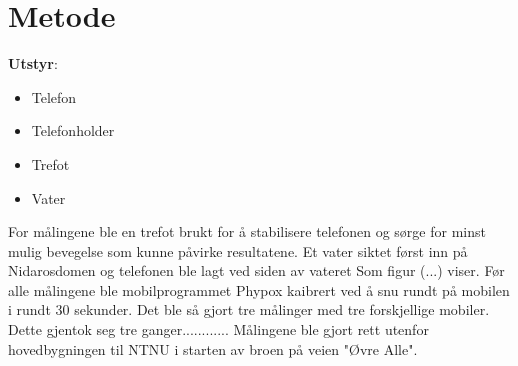 \section{Metode}
\noindent\textbf{Utstyr}:
\begin{itemize}
    \item Telefon
    \item Telefonholder
    \item Trefot
    \item Vater
\end{itemize}
  
For målingene ble en trefot brukt for å stabilisere telefonen og sørge for minst mulig bevegelse som kunne påvirke resultatene. Et vater siktet først inn på Nidarosdomen og telefonen ble lagt ved siden av vateret Som figur (...) viser. Før alle målingene ble mobilprogrammet Phypox kaibrert ved å snu rundt på mobilen i rundt 30 sekunder. Det ble så gjort tre målinger med tre forskjellige mobiler. Dette gjentok seg tre ganger............
Målingene ble gjort rett utenfor hovedbygningen til NTNU i starten av broen på veien "Øvre Alle". 

